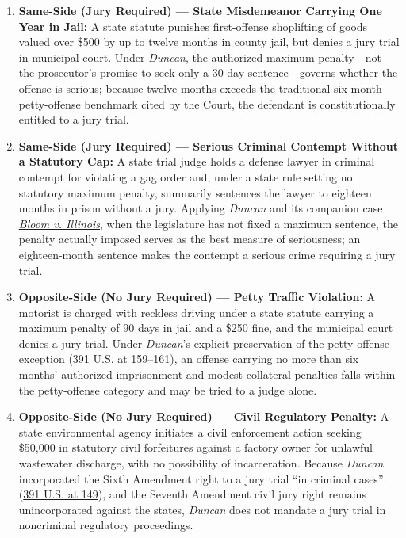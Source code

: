 \documentclass[12pt]{article}
\begin{document}
\begin{enumerate}
  \item \textbf{Same-Side (Jury Required) --- State Misdemeanor Carrying One Year in Jail:} A state statute punishes first-offense shoplifting of goods valued over \$500 by up to twelve months in county jail, but denies a jury trial in municipal court. Under \textit{Duncan}, the authorized maximum penalty---not the prosecutor's promise to seek only a 30-day sentence---governs whether the offense is serious; because twelve months exceeds the traditional six-month petty-offense benchmark cited by the Court, the defendant is constitutionally entitled to a jury trial.
  \item \textbf{Same-Side (Jury Required) --- Serious Criminal Contempt Without a Statutory Cap:} A state trial judge holds a defense lawyer in criminal contempt for violating a gag order and, under a state rule setting no statutory maximum penalty, summarily sentences the lawyer to eighteen months in prison without a jury. Applying \textit{Duncan} and its companion case \href{https://supreme.justia.com/cases/federal/us/391/194/}{\textit{Bloom v. Illinois}}, when the legislature has not fixed a maximum sentence, the penalty actually imposed serves as the best measure of seriousness; an eighteen-month sentence makes the contempt a serious crime requiring a jury trial.
  \item \textbf{Opposite-Side (No Jury Required) --- Petty Traffic Violation:} A motorist is charged with reckless driving under a state statute carrying a maximum penalty of 90 days in jail and a \$250 fine, and the municipal court denies a jury trial. Under \textit{Duncan}'s explicit preservation of the petty-offense exception (\href{https://supreme.justia.com/cases/federal/us/391/145/}{391 U.S. at 159--161}), an offense carrying no more than six months' authorized imprisonment and modest collateral penalties falls within the petty-offense category and may be tried to a judge alone.
  \item \textbf{Opposite-Side (No Jury Required) --- Civil Regulatory Penalty:} A state environmental agency initiates a civil enforcement action seeking \$50,000 in statutory civil forfeitures against a factory owner for unlawful wastewater discharge, with no possibility of incarceration. Because \textit{Duncan} incorporated the Sixth Amendment right to a jury trial ``in criminal cases'' (\href{https://supreme.justia.com/cases/federal/us/391/145/}{391 U.S. at 149}), and the Seventh Amendment civil jury right remains unincorporated against the states, \textit{Duncan} does not mandate a jury trial in noncriminal regulatory proceedings.

\end{enumerate}
\end{document}
